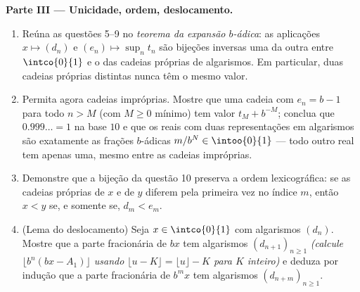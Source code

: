 \begin{problem}
\medskip
\noindent\textbf{Parte III --- Unicidade, ordem, deslocamento.}
\begin{enumerate}
  \item Reúna as questões 5--9 no \emph{teorema da expansão
        $b$-ádica}: as aplicações $x \mapsto (d_n)$ e $(e_n) \mapsto
        \sup_n t_n$ são bijeções inversas uma da outra entre
        $\intco{0}{1}$ e o  das cadeias próprias de algarismos. Em
        particular, duas cadeias próprias distintas nunca têm o mesmo
        valor.
  \item Permita agora cadeias impróprias. Mostre que uma cadeia com $e_n
        = b - 1$ para todo $n > M$ (com $M \geq 0$ mínimo) tem
        valor $t_M + b^{-M}$; conclua que $0.999\dots = 1$ na
        base $10$ e que os reais com duas representações em algarismos
        são exatamente as frações $b$-ádicas
        $m/b^N \in \intoo{0}{1}$ --- todo outro real tem apenas
        uma, mesmo entre as cadeias impróprias.
  \item Demonstre que a bijeção da questão 10 preserva a ordem
        lexicográfica: se as cadeias próprias de $x$ e de $y$ diferem
        pela primeira vez no índice $m$, então $x < y$ se, e somente se,
        $d_m < e_m$.
  \item (Lema do deslocamento) Seja $x \in \intco{0}{1}$ com algarismos
        $(d_n)$. Mostre que a parte fracionária de $bx$ tem algarismos
        $(d_{n+1})_{n \geq 1}$ \emph{(calcule $\lfloor b^n(bx -
        A_1)\rfloor$ usando $\lfloor u - K \rfloor = \lfloor u
        \rfloor - K$ para $K$ inteiro)} e deduza por indução
        que a parte fracionária de $b^m x$ tem algarismos
        $(d_{n+m})_{n \geq 1}$.
\end{enumerate}


\end{problem}
